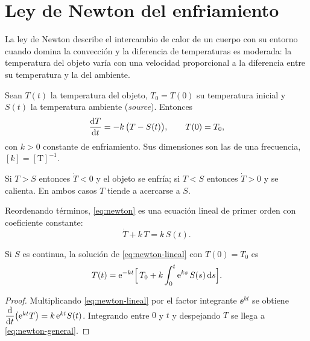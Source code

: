 \section{Ley de Newton del enfriamiento}

La ley de Newton describe el intercambio de calor de un cuerpo con su entorno cuando domina la convección y la diferencia de temperaturas es moderada: la temperatura del objeto varía con una velocidad proporcional a la diferencia entre su temperatura y la del ambiente.

\begin{modelo}
Sean $T(t)$ la temperatura del objeto, $T_0=T(0)$ su temperatura inicial y $S(t)$ la temperatura ambiente (\emph{source}). Entonces
\begin{equation}
  \dfrac{\mathrm{d} T}{\mathrm{d} t} = -k\,\bigl(T - S(t)\bigr), \qquad T(0)=T_0,
  \label{eq:newton}
\end{equation}
con $k>0$ constante de enfriamiento. Sus dimensiones son las de una frecuencia, $[k]=[\mathrm{T}]^{-1}$.
\end{modelo}

\begin{remark}
Si $T>S$ entonces $\dot T<0$ y el objeto se enfría; si $T<S$ entonces $\dot T>0$ y se calienta. En ambos casos $T$ tiende a acercarse a $S$.
\end{remark}

Reordenando términos, \eqref{eq:newton} es una ecuación lineal de primer orden con coeficiente constante:
\begin{equation}
  \dot T + k\,T = k\,S(t).
  \label{eq:newton-lineal}
\end{equation}

\begin{proposition}\label{prop:newton-general}
Si $S$ es continua, la solución de \eqref{eq:newton-lineal} con $T(0)=T_0$ es
\begin{equation}
  T(t) = \mathrm{e}^{-kt}\Bigl[\,T_0 + k\int_0^t \mathrm{e}^{ks}\,S(s)\,\mathrm{d} s\Bigr].
  \label{eq:newton-general}
\end{equation}
\end{proposition}

\begin{proof}
Multiplicando \eqref{eq:newton-lineal} por el factor integrante $\ee^{kt}$ se obtiene $\dfrac{\mathrm{d} }{\mathrm{d} t}\bigl(\mathrm{e}^{kt}T\bigr)=k\,\mathrm{e}^{kt}S(t)$. Integrando entre $0$ y $t$ y despejando $T$ se llega a \eqref{eq:newton-general}.
\end{proof}

